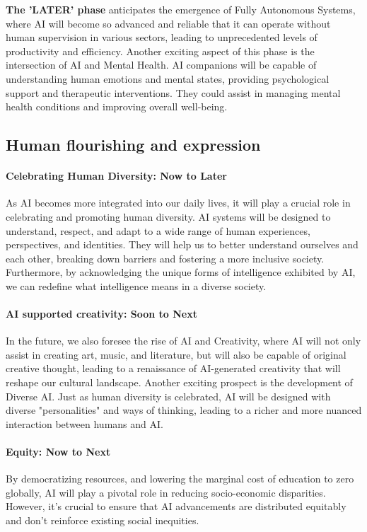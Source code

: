 \textbf{The 'LATER' phase} anticipates the emergence of Fully Autonomous Systems, where AI will become so advanced and reliable that it can operate without human supervision in various sectors, leading to unprecedented levels of productivity and efficiency. Another exciting aspect of this phase is the intersection of AI and Mental Health. AI companions will be capable of understanding human emotions and mental states, providing psychological support and therapeutic interventions. They could assist in managing mental health conditions and improving overall well-being.

\subsection{Human flourishing and expression}
\paragraph{Celebrating Human Diversity: Now to Later}\par
As AI becomes more integrated into our daily lives, it will play a crucial role in celebrating and promoting human diversity. AI systems will be designed to understand, respect, and adapt to a wide range of human experiences, perspectives, and identities. They will help us to better understand ourselves and each other, breaking down barriers and fostering a more inclusive society. Furthermore, by acknowledging the unique forms of intelligence exhibited by AI, we can redefine what intelligence means in a diverse society.
\paragraph{AI supported creativity: Soon to Next}\par
In the future, we also foresee the rise of AI and Creativity, where AI will not only assist in creating art, music, and literature, but will also be capable of original creative thought, leading to a renaissance of AI-generated creativity that will reshape our cultural landscape. Another exciting prospect is the development of Diverse AI. Just as human diversity is celebrated, AI will be designed with diverse "personalities" and ways of thinking, leading to a richer and more nuanced interaction between humans and AI.

\paragraph{Equity: Now to Next}\par
By democratizing resources, and lowering the marginal cost of education to zero globally, AI will play a pivotal role in reducing socio-economic disparities. However, it's crucial to ensure that AI advancements are distributed equitably and don't reinforce existing social inequities.
